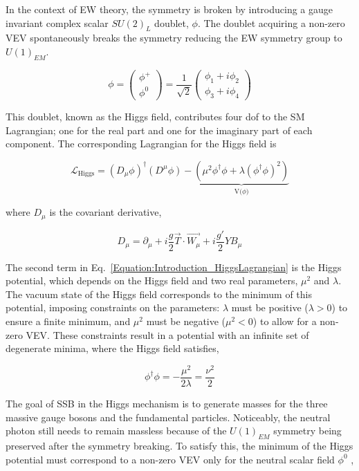 In the context of EW theory, the symmetry is broken by introducing a gauge invariant complex scalar $SU(2)_{L}$ doublet, $\phi$. The doublet acquiring a non-zero \ac{VEV} spontaneously breaks the symmetry reducing the EW symmetry group to $U(1)_{EM}$.

\[
\phi =
\begin{pmatrix}
\phi^{+} \\
\phi^{0} 
\end{pmatrix}
= \frac{1}{\sqrt{2}} \begin{pmatrix}
    \phi_{1} + i\phi_{2} \\
    \phi_{3} + i\phi_{4}
\end{pmatrix}
\]

This doublet, known as the Higgs field, contributes four \ac{dof} to the SM Lagrangian; one for the real part and one for the imaginary part of each component. The corresponding Lagrangian for the Higgs field is

\begin{equation}
    \mathcal{L}_{\text{Higgs}} = (D_{\mu} \phi)^{\dagger}(D^{\mu}\phi) - \underbrace{(\mu^{2}\phi^{\dagger}\phi + \lambda(\phi^{\dagger}\phi)^2)}_{\text{V($\phi$)}}
\label{Equation:Introduction_HiggsLagrangian}
\end{equation}

where $D_{\mu}$ is the covariant derivative,

\begin{equation}
    D_{\mu} = \partial_{\mu} + i\frac{g}{2}\vec{T}\cdot\vec{W_{\mu}} + i\frac{g'}{2}YB_{\mu}
\end{equation}

The second term in Eq.~\ref{Equation:Introduction_HiggsLagrangian} is the Higgs potential, which depends on the Higgs field and two real parameters, $\mu^{2}$ and $\lambda$. The vacuum state of the Higgs field corresponds to the minimum of this potential, imposing constraints on the parameters: $\lambda$ must be positive ($\lambda > 0$) to ensure a finite minimum, and $\mu^{2}$ must be negative ($\mu^{2} < 0$) to allow for a non-zero VEV. These constraints result in a potential with an infinite set of degenerate minima, where the Higgs field satisfies,

\begin{equation}
    \phi^{\dagger}\phi = -\frac{\mu^{2}}{2\lambda} = \frac{\nu^2}{2}
\end{equation}

The goal of SSB in the Higgs mechanism is to generate masses for the three massive gauge bosons and the fundamental particles.  Noticeably, the neutral photon still needs to remain massless because of the $U(1)_{EM}$ symmetry being preserved after the symmetry breaking. To satisfy this, the minimum of the Higgs potential must correspond to a non-zero VEV only for the neutral scalar field $\phi^{0}$ \cite{Higgs_VacuumState_Choice},

